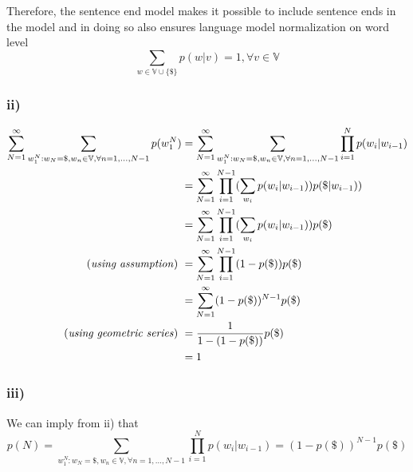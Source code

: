 Therefore, the sentence end model makes it possible to include sentence ends 
in the model and in doing so also ensures language model normalization on word 
level 
\[
	\sum_{w \in \mathbb{V} \cup \{\$\}} p(w|v) = 1, \forall v \in \mathbb{V}
\]

\subsubsection*{ii)}%
\label{ssub:ii_}


\begin{align*}
	\sum_{N=1}^{\infty}  \sum_{w_{1}^{N}: w_N = \$, w_n \in \mathbb{V}, \forall n = 1,...,N-1} p(w_1^{N}) &= \sum_{N=1}^{\infty}  \sum_{w_{1}^{N}: w_N = \$, w_n \in \mathbb{V}, \forall n = 1,...,N-1} \prod_{i = 1}^{N} p(w_i|w_{i-1})  \\
	 &= \sum_{N=1}^{\infty}  \prod_{i = 1}^{N-1} (\sum_{w_i} p(w_i|w_{i-1})) p(\$|w_{i-1}))  \\
	 &= \sum_{N=1}^{\infty}  \prod_{i = 1}^{N-1} (\sum_{w_i} p(w_i|w_{i-1})) p(\$)  \\
	\text{(\textit{using assumption}) }  &= \sum_{N=1}^{\infty}  \prod_{i = 1}^{N-1} (1-p(\$)) p(\$)  \\
	 &= \sum_{N=1}^{\infty}  (1-p(\$))^{N-1} p(\$)  \\
	\text{(\textit{using geometric series}) }	 &= \frac{1}{1 - (1 -p(\$))} p(\$)  \\
	 &= 1
\end{align*}

\subsubsection*{iii)}%
\label{ssub:iii_}

We can imply from ii) that 
\[
	p(N) = \sum_{w_{1}^{N}: w_N = \$, w_n \in \mathbb{V}, \forall n = 1,...,N-1} \prod_{i = 1}^{N} p(w_i|w_{i-1}) = (1-p(\$))^{N-1} p(\$) 
\]

